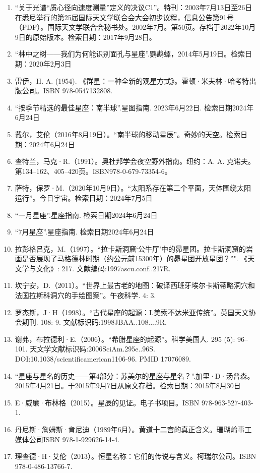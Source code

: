 \begin{enumerate}
\item “关于光谱“质心径向速度测量”定义的决议C1”。特刊：2003年7月13日至26日在悉尼举行的第25届国际天文学联合会大会初步议程，信息公告第91号（PDF）。国际天文学联合会秘书处。2002年7月。第50页。存档于2022年10月9日的原始版本。检索日期：2017年9月28日。
\item “林中之树——我们为何能识别面孔与星座”.鹦鹉螺，2014年5月19日。检索日期：2020年2月3日
\item 雷伊，H. A. (1954). 《群星：一种全新的观星方式》。霍顿·米夫林·哈考特出版公司。ISBN 978-0547132808.
\item “按季节精选的最佳星座：南半球”.星图指南. 2023年6月22日. 检索日期2024年6月24日
\item 戴尔，艾伦（2016年8月19日）。“南半球的移动星辰”。奇妙的天空。检索日期：2024年6月24日
\item 查特兰，马克·R.（1991）。奥杜邦学会夜空野外指南。纽约：A. A. 克诺夫。第134–162、405–420页。ISBN978-0-679-73354-6。
\item 萨特，保罗·M.（2020年10月9日）。“太阳系存在第二个平面，天体围绕太阳运行”。今日宇宙。检索日期：2024年7月5日
\item “一月星座”.星座指南. 检索日期2024年6月24日
\item “7月星座”.星座指南. 检索日期2024年6月24日
\item 拉彭格吕克，M.（1997）。“拉卡斯洞窟‘公牛厅’中的昴星团。拉卡斯洞窟的岩画是否展现了马格德林时期（约公元前15300年）的昴星团开放星团？”". 《天文学与文化》: 217. 文献编码:1997ascu.conf..217R.
\item 坎宁安，D.（2011）。“世界上最古老的地图：破译西班牙埃尔卡斯蒂略洞穴和法国拉斯科洞穴的手绘图案”。午夜科学. 4: 3.
\item 罗杰斯，J·H（1998）。“古代星座的起源：I.美索不达米亚传统”。英国天文协会期刊. 108: 9. 文献标识码:1998JBAA..108....9R.
\item 谢弗，布拉德利·E.（2006）。“希腊星座的起源”。科学美国人. 295 (5): 96–101. 天文学文献标识码:2006SciAm.295e..96S. DOI:10.1038/scientificamerican1106-96. PMID 17076089.
\item “星座与星名的历史——第4部分：苏美尔的星座与星名？”.加里·D·汤普森。2015年4月21日。于2015年9月7日从原文存档。检索日期：2015年8月30日
\item E·威廉·布林格（2015）。星辰的见证。电子书项目。ISBN 978-963-527-403-1.
\item 丹尼斯·詹姆斯·肯尼迪（1989年6月）。黄道十二宫的真正含义。珊瑚岭事工媒体公司ISBN 978-1-929626-14-4.
\item 理查德·H·艾伦（2013）。恒星名称：它们的传说与含义。柯瑞尔公司。ISBN 978-0-486-13766-7.

\end{enumerate}
